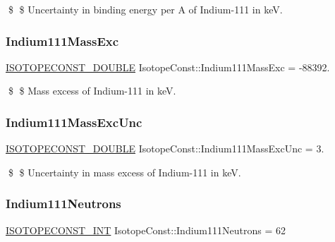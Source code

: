 \$ \$ Uncertainty in binding energy per A of Indium-\/111 in keV. \mbox{\label{group___isotope_const-_indium-_in111_ga109a844256b30ddb5596103993dce46e}} 
\subsubsection{\texorpdfstring{Indium111\+Mass\+Exc}{Indium111MassExc}}
{\footnotesize\ttfamily \mbox{\hyperlink{group___isotope_const-_macros_ga8f45a7272ce02c0b4c65c44636ed719a}{I\+S\+O\+T\+O\+P\+E\+C\+O\+N\+S\+T\+\_\+\+D\+O\+U\+B\+LE}} Isotope\+Const\+::\+Indium111\+Mass\+Exc = -\/88392.}

\$ \$ Mass excess of Indium-\/111 in keV. \mbox{\label{group___isotope_const-_indium-_in111_ga8a5b9075c971206a2f4aad014d811301}} 
\subsubsection{\texorpdfstring{Indium111\+Mass\+Exc\+Unc}{Indium111MassExcUnc}}
{\footnotesize\ttfamily \mbox{\hyperlink{group___isotope_const-_macros_ga8f45a7272ce02c0b4c65c44636ed719a}{I\+S\+O\+T\+O\+P\+E\+C\+O\+N\+S\+T\+\_\+\+D\+O\+U\+B\+LE}} Isotope\+Const\+::\+Indium111\+Mass\+Exc\+Unc = 3.}

\$ \$ Uncertainty in mass excess of Indium-\/111 in keV. \mbox{\label{group___isotope_const-_indium-_in111_gac832d0b2d3201b53579aa8f9f350426c}} 
\subsubsection{\texorpdfstring{Indium111\+Neutrons}{Indium111Neutrons}}
{\footnotesize\ttfamily \mbox{\hyperlink{group___isotope_const-_macros_ga5f18360b3e99483a35c32d789e62621c}{I\+S\+O\+T\+O\+P\+E\+C\+O\+N\+S\+T\+\_\+\+I\+NT}} Isotope\+Const\+::\+Indium111\+Neutrons = 62}

